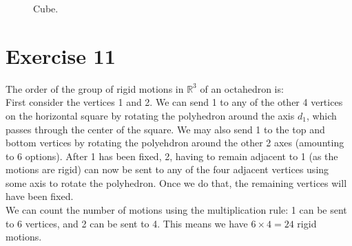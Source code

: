 \documentclass[12pt]{article}
\newcommand{\R}{\mathbb{R}}
\begin{document}
\begin{figure}[H]

        \caption{\label{fig:figure1} Cube.}
    \end{figure}


    \section*{Exercise 11}
    The order of the group of rigid motions in $\R^3$ of an octahedron is: \\
    First consider the vertices 1 and 2.
    We can send 1 to any of the other 4 vertices on the horizontal square by
    rotating the polyhedron around the axis $d_1$, which passes through
    the center of the square. We may also send 1 to the top and bottom vertices
    by rotating the polyehdron around the other 2 axes (amounting to 6 options).
    After 1 has been fixed, 2, having to remain adjacent to 1 (as the
    motions are rigid) can now be sent to any of the four adjacent vertices
    using some axis to rotate the polyhedron. Once we do that, the
    remaining vertices will have been fixed. \\
    We can count the number of motions using the multiplication rule:
    1 can be sent to 6 vertices, and 2 can be sent to 4. This means we
    have $6 \times 4 = 24$ rigid motions. 
\end{document}
